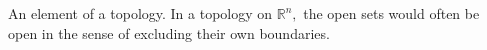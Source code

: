 An element of a topology. In a topology on $ \mathbb{R} ^n , $
the open sets would often be open in the sense of excluding 
their own boundaries.